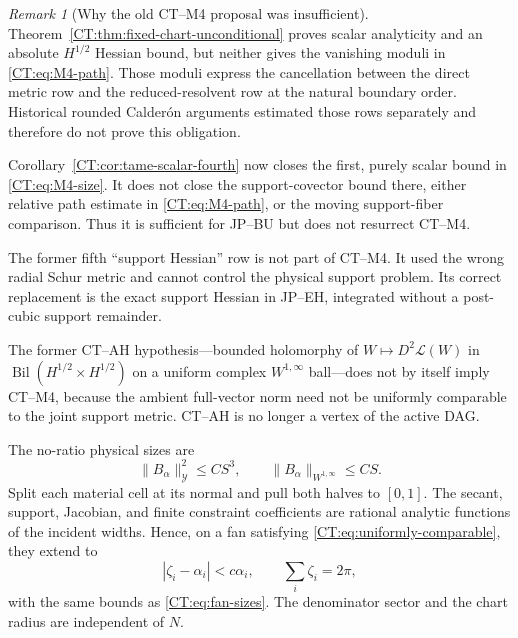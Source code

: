 \documentclass[11pt]{amsart}
\numberwithin{equation}{section}
\theoremstyle{definition}
\theoremstyle{remark}
\newtheorem{remark}[theorem]{Remark}
\newcommand{\Y}{\mathcal Y}
\begin{document}
\begin{remark}[Why the old CT--M4 proposal was insufficient]
Theorem~\ref{CT:thm:fixed-chart-unconditional} proves scalar analyticity and
an absolute $H^{1/2}$ Hessian bound, but neither gives the vanishing moduli
in \eqref{CT:eq:M4-path}.  Those moduli express the cancellation between the
direct metric row and the reduced-resolvent row at the natural boundary
order.  Historical rounded Calder\'on arguments estimated those rows
separately and therefore do not prove this obligation.

Corollary~\ref{CT:cor:tame-scalar-fourth} now closes the first, purely scalar
bound in \eqref{CT:eq:M4-size}.  It does not close the support-covector bound
there, either relative path estimate in \eqref{CT:eq:M4-path}, or the moving
support-fiber comparison.  Thus it is sufficient for JP--BU but does not
resurrect CT--M4.

The former fifth ``support Hessian'' row is not part of CT--M4.  It used the
wrong radial Schur metric and cannot control the physical support problem.
Its correct replacement is the exact support Hessian in JP--EH, integrated
without a post-cubic support remainder.

The former CT--AH hypothesis---bounded holomorphy of
$W\mapsto D^2\mathcal L(W)$ in
$\operatorname {Bil}(H^{1/2}\times H^{1/2})$ on a uniform complex
$W^{1,\infty}$ ball---does not by itself imply CT--M4, because the ambient
full-vector norm need not be uniformly comparable to the joint support
metric.  CT--AH is no longer a vertex of the active DAG.
\end{remark}

The no-ratio physical sizes are
\begin{equation}\label{CT:eq:fan-sizes}
 \|B_\alpha\|_\Y^2\le CS^3,\qquad
 \|B_\alpha\|_{W^{1,\infty}}\le CS.
\end{equation}
Split each material cell at its normal and pull both halves to $[0,1]$.
The secant, support, Jacobian, and finite constraint coefficients are
rational analytic functions of the incident widths.  Hence, on a fan
satisfying \eqref{CT:eq:uniformly-comparable}, they extend to
\begin{equation}\label{CT:eq:material-polydisc}
 |\zeta_i-\alpha_i|<c\alpha_i,\qquad
 \sum_i\zeta_i=2\pi,
\end{equation}
with the same bounds as \eqref{CT:eq:fan-sizes}.  The denominator sector and
the chart radius are independent of $N$.
\end{document}
